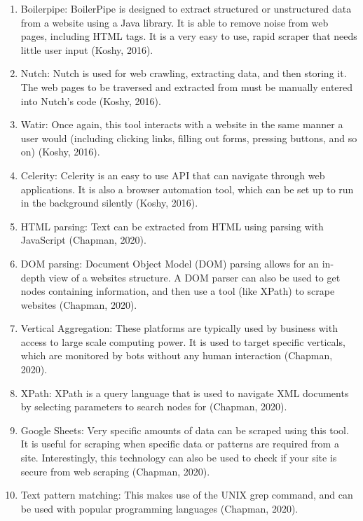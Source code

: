 \documentclass[]{article}
\begin{document}
\begin{enumerate}
\begin{enumerate}
	\item Boilerpipe:  BoilerPipe is designed to extract structured or unstructured data from a website using a Java library.  It is able to remove noise from web pages, including HTML tags. It is a very easy to use, rapid scraper that needs little user input (Koshy, 2016). 
	
	\item Nutch:  Nutch is used for web crawling, extracting data, and then storing it.  The web pages to be traversed and extracted from must be manually entered into Nutch's code (Koshy, 2016).  
	
	\item Watir:  Once again, this tool interacts with a website in the same manner a user would (including clicking links, filling out forms, pressing buttons, and so on) (Koshy, 2016).  
	
	\item Celerity:  Celerity is an easy to use API that can navigate through web applications.  It is also a browser automation tool, which can be set up to run in the background silently (Koshy, 2016).
	
	\item HTML parsing: Text can be extracted from HTML using parsing with JavaScript (Chapman, 2020).
	
	\item DOM parsing: Document Object Model (DOM) parsing allows for an in-depth view of a websites structure.  A DOM parser can also be used to get nodes containing information, and then use a tool (like XPath) to scrape websites (Chapman, 2020).
	
	\item Vertical Aggregation: These platforms are typically used by business with access to large scale computing power.  It is used to target specific verticals, which are monitored by bots without any human interaction (Chapman, 2020).
	
	\item XPath: XPath is a query language that is used to navigate XML documents by selecting parameters to search nodes for (Chapman, 2020). 
	
	\item Google Sheets: Very specific amounts of data can be scraped using this tool.  It is useful for scraping when specific data or patterns are required from a site.  Interestingly, this technology can also be used to check if your site is secure from web scraping (Chapman, 2020).
	
	\item Text pattern matching: This makes use of the UNIX grep command, and can be used with popular programming languages (Chapman, 2020).  
	
\end{enumerate}


	
\end{enumerate}
\end{document}
